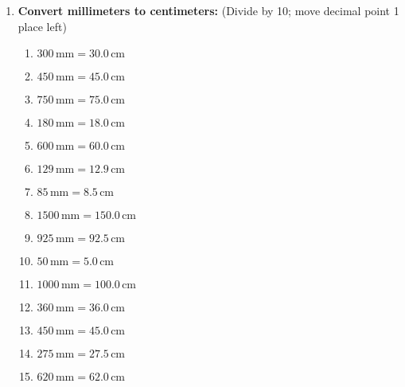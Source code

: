 \documentclass[12pt]{article}
\begin{document}
\begin{enumerate}
    \item \textbf{Convert millimeters to centimeters:}
    (Divide by 10; move decimal point 1 place left)
    \begin{multicols}{2}
    \begin{enumerate}
        \item \(300 \, \text{mm} = 30.0 \, \text{cm}\)
        \item \(450 \, \text{mm} = 45.0 \, \text{cm}\)
        \item \(750 \, \text{mm} = 75.0 \, \text{cm}\)
        \item \(180 \, \text{mm} = 18.0 \, \text{cm}\)
        \item \(600 \, \text{mm} = 60.0 \, \text{cm}\)
        \item \(129 \, \text{mm} = 12.9 \, \text{cm}\)
        \item \(85 \, \text{mm} = 8.5 \, \text{cm}\)
        \item \(1500 \, \text{mm} = 150.0 \, \text{cm}\)
        \item \(925 \, \text{mm} = 92.5 \, \text{cm}\)
        \item \(50 \, \text{mm} = 5.0 \, \text{cm}\)
        \item \(1000 \, \text{mm} = 100.0 \, \text{cm}\)
        \item \(360 \, \text{mm} = 36.0 \, \text{cm}\)
        \item \(450 \, \text{mm} = 45.0 \, \text{cm}\)
        \item \(275 \, \text{mm} = 27.5 \, \text{cm}\)
        \item \(620 \, \text{mm} = 62.0 \, \text{cm}\)
    \end{enumerate}
    \end{multicols}
\end{enumerate}
\end{document}
